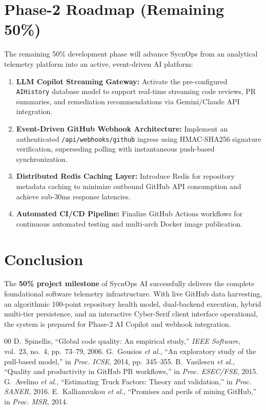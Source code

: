 \documentclass[conference]{IEEEtran}
\begin{document}
\section{Phase-2 Roadmap (Remaining 50\%)}
The remaining 50\% development phase will advance SycnOps from an analytical telemetry platform into an active, event-driven AI platform:
\begin{enumerate}
    \item \textbf{LLM Copilot Streaming Gateway:} Activate the pre-configured \texttt{AIHistory} database model to support real-time streaming code reviews, PR summaries, and remediation recommendations via Gemini/Claude API integration.
    \item \textbf{Event-Driven GitHub Webhook Architecture:} Implement an authenticated \texttt{/api/webhooks/github} ingress using HMAC-SHA256 signature verification, superseding polling with instantaneous push-based synchronization.
    \item \textbf{Distributed Redis Caching Layer:} Introduce Redis for repository metadata caching to minimize outbound GitHub API consumption and achieve sub-30ms response latencies.
    \item \textbf{Automated CI/CD Pipeline:} Finalize GitHub Actions workflows for continuous automated testing and multi-arch Docker image publication.
\end{enumerate}

\section{Conclusion}
The \textbf{50\% project milestone} of SycnOps AI successfully delivers the complete foundational software telemetry infrastructure. With live GitHub data harvesting, an algorithmic 100-point repository health model, dual-backend execution, hybrid multi-tier persistence, and an interactive Cyber-Serif client interface operational, the system is prepared for Phase-2 AI Copilot and webhook integration.

\balance
\begin{thebibliography}{00}
 D.~Spinellis, ``Global code quality: An empirical study,'' \emph{IEEE Software}, vol.~23, no.~4, pp.~73--79, 2006.
 G.~Gousios \emph{et al.}, ``An exploratory study of the pull-based model,'' in \emph{Proc. ICSE}, 2014, pp.~345--355.
 B.~Vasilescu \emph{et al.}, ``Quality and productivity in GitHub PR workflows,'' in \emph{Proc. ESEC/FSE}, 2015.
 G.~Avelino \emph{et al.}, ``Estimating Truck Factors: Theory and validation,'' in \emph{Proc. SANER}, 2016.
 E.~Kalliamvakou \emph{et al.}, ``Promises and perils of mining GitHub,'' in \emph{Proc. MSR}, 2014.
\end{thebibliography}
\end{document}
